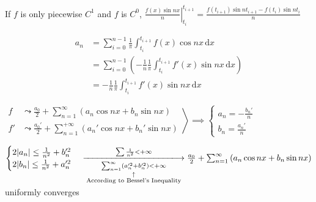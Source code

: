 If $f$ is only piecewise $C^1$ and $f$ is $C^0$, $\left.\frac{f(x)\sin nx}{n}\right|_{t_i}^{t_{i+1}}=\frac{f(t_{i+1})\sin nt_{i+1}-f(t_i)\sin n t_i}{n}$

\begin{align*}
    a_n & =\sum_{i=0}^{n-1}\frac{1}{\pi}\int_{t_i}^{t_{i+1}}f(x)\cos nx\,\mathrm{d}x                           \\
        & =\sum_{i=0}^{n-1}\left(-\frac{1}{n}\frac{1}{\pi}\int_{t_i}^{t_{i+1}}f'(x)\sin nx\,\mathrm{d}x\right) \\
        & =-\frac{1}{n}\frac{1}{\pi}\int_{t_i}^{t_{i+1}}f'(x)\sin nx\,\mathrm{d}x
\end{align*}

$\left.\begin{aligned}
        f  & \leadsto\frac{a_0}{2}+\sum_{n=1}^{\infty}\left(a_n\cos nx+b_n\sin nx\right)     \\
        f' & \leadsto\frac{a_0'}{2}+\sum_{n=1}^{+\infty}\left(a_n'\cos nx+b_n'\sin nx\right)
    \end{aligned}\right>\implies\begin{cases}
        a_n=-\frac{b_n'}{n} \\
        b_n=\frac{a_n'}{n}
    \end{cases}$

$\begin{cases}
        2|a_n|\leq\frac{1}{n^2}+b_n'^2 \\
        2|b_n|\leq\frac{1}{n^2}+a_n'^2
    \end{cases}\xlongrightarrow[\underset{\substack{\uparrow\\\text{According to Bessel's Inequality}}}{\sum_{n=1}^{\infty}\left(a_n'^2+b_n'^2\right)<+\infty}]{\sum\frac{1}{n^2}<+\infty}\frac{a_0}{2}+\sum_{n=1}^{\infty}\left(a_n\cos nx+b_n\sin nx\right)$ uniformly converges